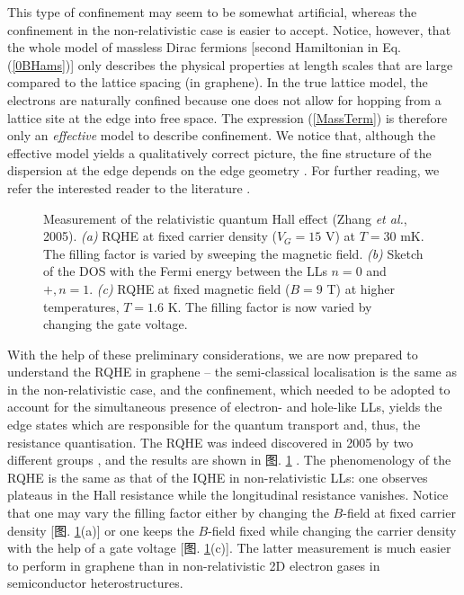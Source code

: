 \documentclass[10pt]{book}
\begin{document}
This type of confinement may seem to be somewhat artificial, whereas the confinement in the non-relativistic 
case is easier to accept. Notice, however, that the whole model of massless Dirac fermions [second Hamiltonian in Eq. (\ref{0BHams})]
only describes the physical properties at length scales that are large compared to the lattice spacing (in graphene). In
the true lattice model, the electrons are naturally confined because one does not allow for hopping from a lattice site at
the edge into free space. The expression (\ref{MassTerm}) is therefore only an {\sl effective} model to describe confinement.
We notice that, although the effective model yields a qualitatively correct picture, 
the fine structure of the dispersion at the edge depends on the edge geometry \cite{BreyFertig}.
For further reading, we refer the interested reader to the literature \cite{antonioRev}.


\begin{figure}
\begin{center}
\end{center}
\caption{ Measurement of the relativistic quantum Hall effect (Zhang {\sl et al.}, 2005). {\sl (a)} RQHE at fixed carrier
density ($V_G=15$ V) at $T=30$ mK. The filling factor is varied by sweeping the magnetic field. 
{\sl (b)} Sketch of the DOS with the Fermi energy between the LLs $n=0$ and $+,n=1$.
{\sl (c)} RQHE at fixed magnetic field ($B=9$ T) at higher temperatures, $T=1.6$ K. The filling factor is now varied by 
changing the gate voltage.}
\label{fig18}
\end{figure}

With the help of these preliminary considerations, we are now prepared to understand the RQHE in graphene -- the semi-classical
localisation is the same as in the non-relativistic case, and the confinement, which needed to be adopted to account for the
simultaneous presence of electron- and hole-like LLs, yields the edge states which are responsible for the quantum transport
and, thus, the resistance quantisation. The RQHE was indeed discovered in 2005 by two different groups \cite{graph1,graph2},
and the results are shown in 图. \ref{fig18} \cite{graph2}. The phenomenology of the RQHE is the same as that of the IQHE in
non-relativistic LLs: one observes plateaus in the Hall resistance while the longitudinal resistance vanishes. Notice that
one may vary the filling factor either by changing the $B$-field at fixed carrier density [图. \ref{fig18}(a)] or
one keeps the $B$-field fixed while changing the carrier density with the help of a gate voltage [图. \ref{fig18}(c)]. The latter
measurement is much easier to perform in graphene than in non-relativistic 2D electron gases in semiconductor heterostructures.
\end{document}
